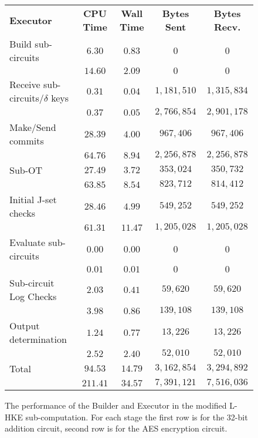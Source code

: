 \documentclass[ %
                    author={Nicholas Tutte},
                supervisor={Prof. Nigel Smart},
                    degree={MEng},
                     title={Secure Two Party Computation},
                  subtitle={A practical comparison of recent protocols},
                      type={Research - GG1K},
                      year={2015} ]{dissertation}
\begin{document}
\begin{figure}[!ht]
						\begin{tabular}{| p{4.3cm} | c c c c |}
							\hline
							\textbf{Executor} & \textbf{CPU Time} & \textbf{Wall Time} & \textbf{Bytes Sent} & \textbf{Bytes Recv.} \\
							\thickhline
							Build sub-circuits & $6.30$ & $0.83$ & $0$ & $0$ \\
									   & $14.60$ & $2.09$ & $0$ & $0$ \\
							\hline
							Receive sub-circuits/$\delta$ keys & $0.31$ & $0.04$ & $1,181,510$ & $1,315,834$ \\
									  & $0.37$ & $0.05$ & $2,766,854$ & $2,901,178$ \\
							\hline
							Make/Send commits & $28.39$ & $4.00$ & $967,406$ & $967,406$ \\
									  & $64.76$ & $8.94$ & $2,256,878$ & $2,256,878$ \\
							\hline
							Sub-OT & $27.49$ & $3.72$ & $353,024$ & $350,732$ \\
							      & $63.85$ & $8.54$ & $823,712$ & $814,412$ \\
							\hline
							Initial J-set checks & $28.46$ & $4.99$ & $549,252$ & $549,252$ \\
									     & $61.31$ & $11.47$ & $1,205,028$ & $1,205,028$ \\
							\hline
							Evaluate sub-circuits & $0.00$ & $0.00$ & $0$ & $0$ \\
									      & $0.01$ & $0.01$ & $0$ & $0$ \\
							\hline
							Sub-circuit Log Checks 	& $2.03$ & $0.41$ & $59,620$ & $59,620$ \\
										& $3.98$ & $0.86$ & $139,108$ & $139,108$ \\
							\hline
							Output determination & $1.24$ & $0.77$ & $13,226$ & $13,226$ \\
									     & $2.52$ & $2.40$ & $52,010$ & $52,010$ \\
							\thickhline
							Total & $94.53$ & $14.79$ & $3,162,854$ & $3,294,892$ \\
							      & $211.41$ & $34.57$ & $7,391,121$ & $7,516,036$ \\
							\hline
						\end{tabular}

						\caption{The performance of the Builder and Executor in the modified L-HKE sub-computation. For each stage the first row is for the 32-bit addition circuit, second row is for the AES encryption circuit. \label{table:L-HKE_Sub_Executor} }
					\end{figure}
\end{document}
